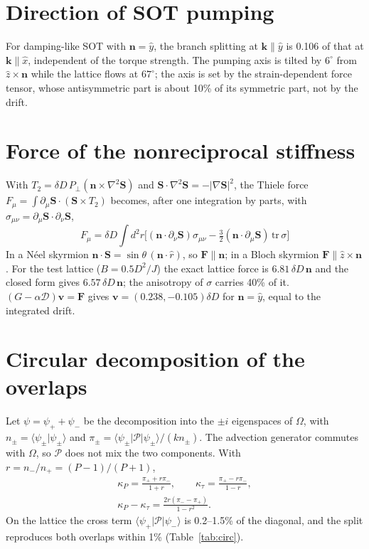 \documentclass[prb,reprint,amsmath,amssymb,superscriptaddress,floatfix]{revtex4-2}
\newcommand{\vv}{\mathbf v}
\newcommand{\kP}{\kappa_P}
\newcommand{\kt}{\kappa_\tau}
\newcommand{\Dm}{\mathcal D}
\newcommand{\Pg}{\mathcal P}
\begin{document}
\section{Direction of SOT pumping}
\label{app:sotdir}

For damping-like SOT with $\mathbf n=\hat y$, the branch splitting at $\mathbf k\parallel\hat y$ is 0.106 of that at $\mathbf k\parallel\hat x$, independent of the torque strength. The pumping axis is tilted by $6^\circ$ from $\hat z\times\mathbf n$ while the lattice flows at $67^\circ$; the axis is set by the strain-dependent force tensor, whose antisymmetric part is about 10\% of its symmetric part, not by the drift.

\section{Force of the nonreciprocal stiffness}
\label{app:force}

With $T_2=\delta D\,P_\perp(\mathbf n\times\nabla^2\mathbf S)$ and $\mathbf S\cdot\nabla^2\mathbf S=-|\nabla\mathbf S|^2$, the Thiele force $F_\mu=\int\partial_\mu\mathbf S\cdot(\mathbf S\times T_2)$ becomes, after one integration by parts, with $\sigma_{\mu\nu}=\partial_\mu\mathbf S\cdot\partial_\nu\mathbf S$,
\begin{equation}
F_\mu=\delta D\!\int\! d^2r\Big[(\mathbf n\cdot\partial_\nu\mathbf S)\sigma_{\mu\nu}-\tfrac32(\mathbf n\cdot\partial_\mu\mathbf S)\,\mathrm{tr}\,\sigma\Big]
\end{equation}
In a N\'eel skyrmion $\mathbf n\cdot\mathbf S=\sin\theta\,(\mathbf n\cdot\hat r)$, so $\mathbf F\parallel\mathbf n$; in a Bloch skyrmion $\mathbf F\parallel\hat z\times\mathbf n$. For the test lattice ($B=0.5D^2/J$) the exact lattice force is $6.81\,\delta D\,\mathbf n$ and the closed form gives $6.57\,\delta D\,\mathbf n$; the anisotropy of $\sigma$ carries 40\% of it. $(G-\alpha\Dm)\vv=\mathbf F$ gives $\vv=(0.238,-0.105)\delta D$ for $\mathbf n=\hat y$, equal to the integrated drift.

\section{Circular decomposition of the overlaps}
\label{app:circular}

Let $\psi=\psi_++\psi_-$ be the decomposition into the $\pm i$ eigenspaces of $\Omega$, with $n_\pm=\langle\psi_\pm|\psi_\pm\rangle$ and $\pi_\pm=\langle\psi_\pm|\Pg|\psi_\pm\rangle/(kn_\pm)$. The advection generator commutes with $\Omega$, so $\Pg$ does not mix the two components. With $r=n_-/n_+=(P-1)/(P+1)$,
\begin{gather}
\kP=\frac{\pi_++r\pi_-}{1+r},\qquad \kt=\frac{\pi_+-r\pi_-}{1-r},\nonumber\\
\kP-\kt=\frac{2r(\pi_--\pi_+)}{1-r^2}.
\end{gather}
On the lattice the cross term $\langle\psi_+|\Pg|\psi_-\rangle$ is 0.2--1.5\% of the diagonal, and the split reproduces both overlaps within 1\% (Table~\ref{tab:circ}).
\end{document}
